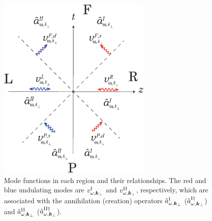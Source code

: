 \documentclass[aps,prd,preprintnumbers,nofootinbib,showpacs,11pt]{revtex4}%
\begin{document}
\begin{widetext}
\begin{figure}[t]
\begin{center}
    \includegraphics[width=7.5cm]{fig3.eps}
\caption{Mode functions in each region and their relationships. 
The red and blue undulating modes are 
$v^{\rm I}_{\omega,\bm k_\perp}$ and $v^{\rm II}_{\omega,\bm k_\perp}$, respectively, 
which are associated with the annihilation (creation) operators 
$\hat a^{\rm I}_{\omega,\bm k_\perp}$ ($\hat a^{{\rm I}\dagger}_{\omega,\bm k_\perp}$) 
and $\hat a^{{\rm II}}_{\omega,\bm k_\perp}$ ($\hat a^{{\rm II}\dagger}_{\omega,\bm k_\perp}$). 
\label{fig:coordinate4}
}
\end{center}
\end{figure}





\end{widetext}
\end{document}
